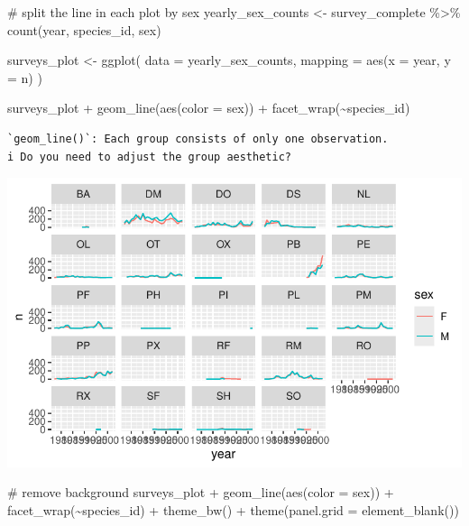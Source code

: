 \documentclass[
  letterpaper,
  DIV=11,
  numbers=noendperiod]{scrreprt}
\newenvironment{Shaded}{\begin{snugshade}}{\end{snugshade}}
\newcommand{\AttributeTok}[1]{\textcolor[rgb]{0.40,0.45,0.13}{#1}}
\newcommand{\CommentTok}[1]{\textcolor[rgb]{0.37,0.37,0.37}{#1}}
\newcommand{\FunctionTok}[1]{\textcolor[rgb]{0.28,0.35,0.67}{#1}}
\newcommand{\NormalTok}[1]{\textcolor[rgb]{0.00,0.23,0.31}{#1}}
\newcommand{\OtherTok}[1]{\textcolor[rgb]{0.00,0.23,0.31}{#1}}
\newcommand{\SpecialCharTok}[1]{\textcolor[rgb]{0.37,0.37,0.37}{#1}}
\begin{document}
\begin{Shaded}
\begin{Highlighting}[]
\CommentTok{\# split the line in each plot by sex}
\NormalTok{yearly\_sex\_counts }\OtherTok{\textless{}{-}}\NormalTok{ survey\_complete }\SpecialCharTok{\%\textgreater{}\%}
  \FunctionTok{count}\NormalTok{(year, species\_id, sex)}

\NormalTok{surveys\_plot }\OtherTok{\textless{}{-}} \FunctionTok{ggplot}\NormalTok{(}
  \AttributeTok{data =}\NormalTok{ yearly\_sex\_counts,}
  \AttributeTok{mapping =} \FunctionTok{aes}\NormalTok{(}\AttributeTok{x =}\NormalTok{ year, }\AttributeTok{y =}\NormalTok{ n)}
\NormalTok{)}

\NormalTok{surveys\_plot }\SpecialCharTok{+} \FunctionTok{geom\_line}\NormalTok{(}\FunctionTok{aes}\NormalTok{(}\AttributeTok{color =}\NormalTok{ sex)) }\SpecialCharTok{+}
  \FunctionTok{facet\_wrap}\NormalTok{(}\SpecialCharTok{\textasciitilde{}}\NormalTok{species\_id)}
\end{Highlighting}
\end{Shaded}

\begin{verbatim}
`geom_line()`: Each group consists of only one observation.
i Do you need to adjust the group aesthetic?
\end{verbatim}

\includegraphics{src/notebooks/r_files/figure-pdf/unnamed-chunk-47-5.pdf}

\begin{Shaded}
\begin{Highlighting}[]
\CommentTok{\# remove background}
\NormalTok{surveys\_plot }\SpecialCharTok{+} \FunctionTok{geom\_line}\NormalTok{(}\FunctionTok{aes}\NormalTok{(}\AttributeTok{color =}\NormalTok{ sex)) }\SpecialCharTok{+}
  \FunctionTok{facet\_wrap}\NormalTok{(}\SpecialCharTok{\textasciitilde{}}\NormalTok{species\_id) }\SpecialCharTok{+}
  \FunctionTok{theme\_bw}\NormalTok{() }\SpecialCharTok{+}
  \FunctionTok{theme}\NormalTok{(}\AttributeTok{panel.grid =} \FunctionTok{element\_blank}\NormalTok{())}
\end{Highlighting}
\end{Shaded}
\end{document}
